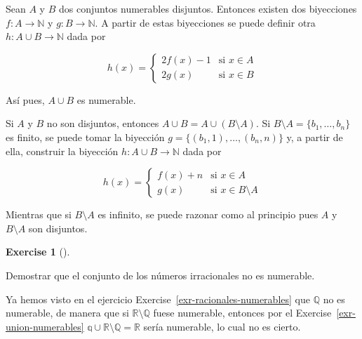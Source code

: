 \documentclass[
  letterpaper,
  DIV=11,
  numbers=noendperiod]{scrreport}
\theoremstyle{definition}
\newtheorem{exercise}{Exercise}[chapter]
\theoremstyle{remark}
\begin{document}
\begin{tcolorbox}[enhanced jigsaw, bottomtitle=1mm, opacityback=0, coltitle=black, toprule=.15mm, colback=white, titlerule=0mm, rightrule=.15mm, title=\textcolor{quarto-callout-tip-color}{\faLightbulb}\hspace{0.5em}{Solución}, breakable, bottomrule=.15mm, colbacktitle=quarto-callout-tip-color!10!white, toptitle=1mm, opacitybacktitle=0.6, left=2mm, leftrule=.75mm, colframe=quarto-callout-tip-color-frame, arc=.35mm]
Sean \(A\) y \(B\) dos conjuntos numerables disjuntos. Entonces existen
dos biyecciones \(f:A\to \mathbb{N}\) y \(g:B\to \mathbb{N}\). A partir
de estas biyecciones se puede definir otra \(h:A\cup B\to \mathbb{N}\)
dada por

\[h(x)=
\begin{cases}
2f(x)-1 & \mbox{si } x\in A\\
2g(x) & \mbox{si } x\in B
\end{cases}
\]

Así pues, \(A\cup B\) es numerable.

Si \(A\) y \(B\) no son disjuntos, entonces
\(A\cup B=A\cup (B\setminus A)\). Si
\(B\setminus A=\{b_1,\ldots, b_n\}\) es finito, se puede tomar la
biyección \(g=\{(b_1,1),\ldots,(b_n,n)\}\) y, a partir de ella,
construir la biyección \(h:A\cup B\to \mathbb{N}\) dada por

\[h(x)=
\begin{cases}
f(x)+n & \mbox{si } x\in A\\
g(x) & \mbox{si } x\in B\setminus A
\end{cases}
\]

Mientras que si \(B\setminus A\) es infinito, se puede razonar como al
principio pues \(A\) y \(B\setminus A\) son disjuntos.
\end{tcolorbox}

\leavevmode{}%
\begin{exercise}[]\label{exr-irracionales-no-numerables}

Demostrar que el conjunto de los números irracionales no es numerable.

\end{exercise}

\begin{tcolorbox}[enhanced jigsaw, bottomtitle=1mm, opacityback=0, coltitle=black, toprule=.15mm, colback=white, titlerule=0mm, rightrule=.15mm, title=\textcolor{quarto-callout-tip-color}{\faLightbulb}\hspace{0.5em}{Solución}, breakable, bottomrule=.15mm, colbacktitle=quarto-callout-tip-color!10!white, toptitle=1mm, opacitybacktitle=0.6, left=2mm, leftrule=.75mm, colframe=quarto-callout-tip-color-frame, arc=.35mm]
Ya hemos visto en el ejercicio Exercise~\ref{exr-racionales-numerables}
que \(\mathbb{Q}\) no es numerable, de manera que si
\(\mathbb{R}\setminus \mathbb{Q}\) fuese numerable, entonces por el
Exercise~\ref{exr-union-numerables}
\(\mathbb{q}\cup \mathbb{R}\setminus \mathbb{Q}=\mathbb{R}\) sería
numerable, lo cual no es cierto.
\end{tcolorbox}
\end{document}
